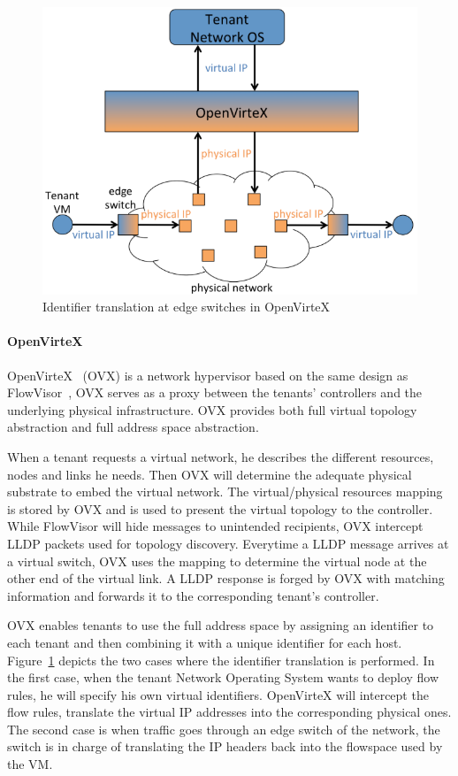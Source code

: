 \begin{figure}[h]
    \centering
    \includegraphics[scale=0.7]{figures/openvirtex.png}
    \caption{Identifier translation at edge switches in OpenVirteX~\cite{OpenVirteX-Al-Shabibi2014}}
    \label{fig:openvirtex}
\end{figure}

\paragraph{OpenVirteX}
OpenVirteX~\cite{OpenVirteX-Al-Shabibi2014} (OVX) is a network hypervisor based on the same design as FlowVisor~\cite{FlowVisor-Sherwood2009}, \ie OVX serves as a proxy between the tenants' controllers and the underlying physical infrastructure. OVX provides both full virtual topology abstraction and full address space abstraction. 

When a tenant requests a virtual network, he describes the different resources, nodes and links he needs.
Then OVX will determine the adequate physical substrate to embed the virtual network.
The virtual/physical resources mapping is stored by OVX and is used to present the virtual topology to the controller.
While FlowVisor will hide messages to unintended recipients, OVX intercept LLDP packets used for topology discovery. Everytime a LLDP message arrives at a virtual switch, OVX uses the mapping to determine the virtual node at the other end of the virtual link. A LLDP response is forged by OVX with matching information and forwards it to the corresponding tenant's controller.

OVX enables tenants to use the full address space by assigning an identifier to each tenant and then combining it with a unique identifier for each host. Figure~\ref{fig:openvirtex} depicts the two cases where the identifier translation is performed. In the first case, when the tenant Network Operating System wants to deploy flow rules, he will specify his own virtual identifiers. OpenVirteX will intercept the flow rules, translate the virtual IP addresses into the corresponding physical ones. The second case is when traffic goes through an edge switch of the network, the switch is in charge of translating the IP headers back into the flowspace used by the VM.

